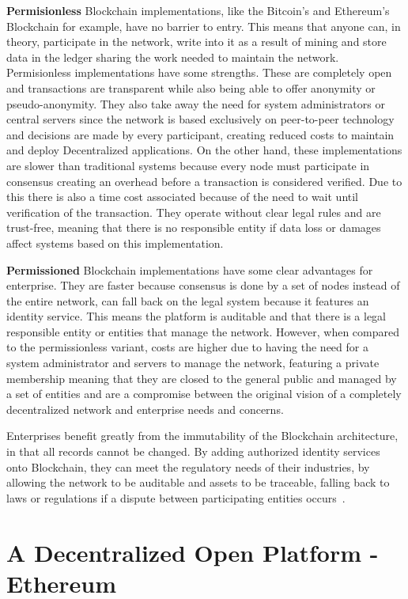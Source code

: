 \textbf{Permisionless} Blockchain implementations, like the Bitcoin's and
Ethereum's Blockchain for example, have no barrier to entry. This means that
anyone can, in theory, participate in the network, write into it as a result of
mining and store data in the ledger sharing the work needed to maintain the
network.  Permisionless implementations have some strengths. These are
completely open and transactions are transparent while also being able to offer
anonymity or pseudo-anonymity. They also take away the need for system
administrators or central servers since the network is based exclusively on
peer-to-peer technology and decisions are made by every participant, creating
reduced costs to maintain and deploy Decentralized applications. On the other
hand, these implementations are slower than traditional systems because every
node must participate in consensus creating an overhead before a transaction is
considered verified. Due to this there is also a time cost associated because
of the need to wait until verification of the transaction. They operate without
clear legal rules and are trust-free, meaning that there is no responsible
entity if data loss or damages affect systems based on this implementation.

\textbf{Permissioned} Blockchain implementations have some clear advantages for
enterprise. They are faster because consensus is done by a set of nodes instead
of the entire network, can fall back on the legal system because it features an
identity service. This means the platform is auditable and that there is a
legal responsible entity or entities that manage the network. However, when
compared to the permissionless variant, costs are higher due to having the need
for a system administrator and servers to manage the network, featuring a
private membership meaning that they are closed to the general public and
managed by a set of entities and are a compromise between the original vision
of a completely decentralized network and enterprise needs and concerns. 

Enterprises benefit greatly from the immutability of the Blockchain
architecture, in that all records cannot be changed. By adding authorized
identity services onto Blockchain, they can meet the regulatory needs of their
industries, by allowing the network to be auditable and assets to be traceable,
falling back to laws or regulations if a dispute between participating entities
occurs~\cite{Barclay2017}.

\section{A Decentralized Open Platform - Ethereum}

